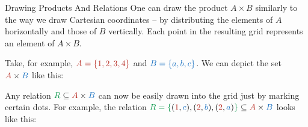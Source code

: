 \documentclass[final]{beamer}
\newlength{\colwidth}
\newcommand{\clr}{\textcolor{BrickRed}}
\newcommand{\clb}{\textcolor{RoyalBlue}}
\newcommand{\clg}{\textcolor{ForestGreen}}
\begin{document}
\begin{frame}[t]
\begin{columns}[t]
\begin{column}{\colwidth}
      \begin{block}{Drawing Products And Relations}
        One can draw the product $A \times B$ similarly to the way we
        draw Cartesian
        coordinates -- by distributing the elements of $A$
        horizontally and those of
        $B$ vertically. Each point in the resulting grid represents
        an element of $A
        \times B$.

        Take, for example, $\clr{A = \{1, 2, 3, 4\}}$ and $\clb{B =
        \{a, b, c\}}$. We
        can depict the set $\clr{A} \times \clb{B}$ like this:
        \begin{center}
        \end{center}
        Any relation $\clg{R} \subseteq \clr{A} \times \clb{B}$ can
        now be easily drawn
        into the grid just by marking certain dots. For example, the
        relation $\clg{R =
          \{}(\clr{1},\clb{c}),
        (\clr{2},\clb{b}),(\clr{2},\clb{a})\clg{\}} \subseteq
        \clr{A} \times \clb{B}$ looks like this:
        \begin{center}
\end{center}
\end{block}
\end{column}
\end{columns}
\end{frame}
\end{document}
